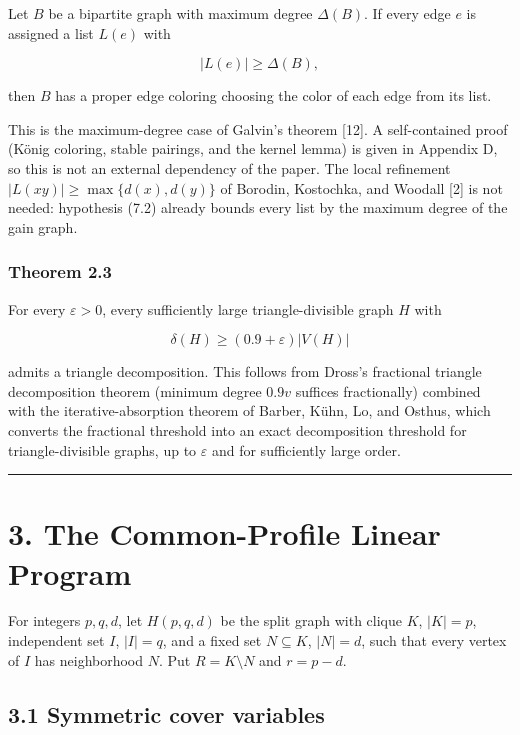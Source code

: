 \documentclass[
  11pt,
]{article}
\begin{document}
Let \(B\) be a bipartite graph with maximum degree \(\Delta(B)\). If
every edge \(e\) is assigned a list \(L(e)\) with

\[
|L(e)|\ge\Delta(B),
\]

then \(B\) has a proper edge coloring choosing the color of each edge
from its list.

This is the maximum-degree case of Galvin's theorem {[}12{]}. A
self-contained proof (König coloring, stable pairings, and the kernel
lemma) is given in Appendix D, so this is not an external dependency of
the paper. The local refinement \(|L(xy)|\ge\max\{d(x),d(y)\}\) of
Borodin, Kostochka, and Woodall {[}2{]} is not needed: hypothesis (7.2)
already bounds every list by the maximum degree of the gain graph.

\subsubsection{Theorem 2.3}\label{theorem-2.3-dense-triangle-decomposition}

For every \(\varepsilon>0\), every sufficiently large triangle-divisible
graph \(H\) with

\[
\delta(H)\ge(0.9+\varepsilon)|V(H)|
\]

admits a triangle decomposition. This follows from Dross's fractional
triangle decomposition theorem (minimum degree \(0.9v\) suffices
fractionally) combined with the iterative-absorption theorem of Barber,
Kühn, Lo, and Osthus, which converts the fractional threshold into an
exact decomposition threshold for triangle-divisible graphs, up to
\(\varepsilon\) and for sufficiently large order.

\begin{center}\rule{0.5\linewidth}{0.5pt}\end{center}

\section{3. The Common-Profile Linear
Program}\label{the-common-profile-linear-program}

For integers \(p,q,d\), let \(H(p,q,d)\) be the split graph with clique
\(K\), \(|K|=p\), independent set \(I\), \(|I|=q\), and a fixed set
\(N\subseteq K\), \(|N|=d\), such that every vertex of \(I\) has
neighborhood \(N\). Put \(R=K\setminus N\) and \(r=p-d\).

\subsection{3.1 Symmetric cover
variables}\label{symmetric-cover-variables}
\end{document}
